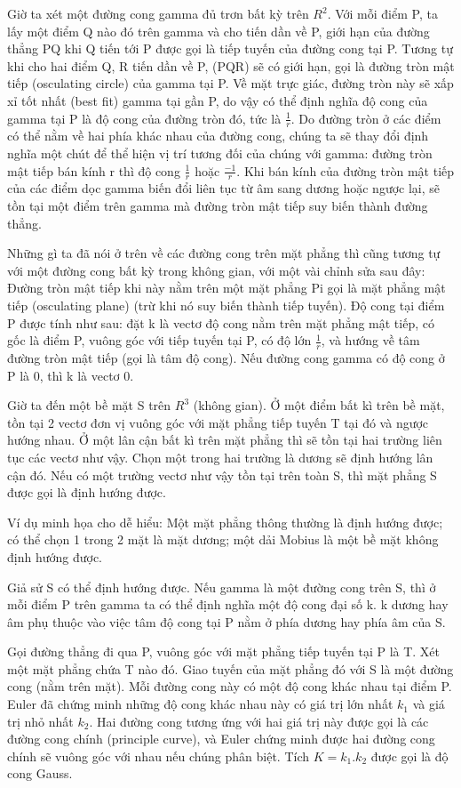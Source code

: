 \begin{multicols}{2}
	Giờ ta xét một đường cong gamma đủ trơn bất kỳ trên $R^2$. Với mỗi điểm P, ta lấy một điểm Q nào đó trên gamma và cho tiến dần về P, giới hạn của đường thẳng PQ khi Q tiến tới P được gọi là tiếp tuyến của đường cong tại P. Tương tự khi cho hai điểm Q, R tiến dần về P, (PQR) sẽ có giới hạn, gọi là đường tròn mật tiếp (osculating circle) của gamma tại P. Về mặt trực giác, đường tròn này sẽ xấp xỉ tốt nhất (best fit) gamma tại gần P, do vậy có thể định nghĩa độ cong của gamma tại P là độ cong của đường tròn đó, tức là $ \frac{1}{r}$. Do đường tròn ở các điểm có thể nằm về hai phía khác nhau của đường cong, chúng ta sẽ thay đổi định nghĩa một chút để thể hiện vị trí tương đối của chúng với gamma: đường tròn mật tiếp bán kính r thì độ cong $ \frac{1}{r}$ hoặc $ \frac{-1}{r}$. Khi bán kính của đường tròn mật tiếp của các điểm dọc gamma biến đổi liên tục từ âm sang dương hoặc ngược lại, sẽ tồn tại một điểm trên gamma mà đường tròn mật tiếp suy biến thành đường thẳng.
	
	Những gì ta đã nói ở trên về các đường cong trên mặt phẳng thì cũng tương tự với một đường cong bất kỳ trong không gian, với một vài chỉnh sửa sau đây:
	Đường tròn mật tiếp khi này nằm trên một mặt phẳng Pi gọi là mặt phẳng mật tiếp (osculating plane) (trừ khi nó suy biến thành tiếp tuyến). Độ cong tại điểm P được tính như sau: đặt k là vectơ độ cong nằm trên mặt phẳng mật tiếp, có gốc là điểm P, vuông góc với tiếp tuyến tại P, có độ lớn $ \frac{1}{r}$, và hướng về tâm đường tròn mật tiếp (gọi là tâm độ cong). Nếu đường cong gamma có độ cong ở P là 0, thì k là vectơ 0. 
	
	Giờ ta đến một bề mặt S trên $R^3$ (không gian). Ở một điểm bất kì trên bề mặt, tồn tại 2 vectơ đơn vị vuông góc với mặt phẳng tiếp tuyến T tại đó và ngược hướng nhau. Ở một lân cận bất kì trên mặt phẳng thì sẽ tồn tại hai trường liên tục các vectơ như vậy. Chọn một trong hai trường là dương sẽ định hướng lân cận đó. Nếu có một trường vectơ như vậy tồn tại trên toàn S, thì mặt phẳng S được gọi là định hướng được. 
	
	Ví dụ minh họa cho dễ hiểu: Một mặt phẳng thông thường là định hướng được; có thể chọn 1 trong 2 mặt là mặt dương; một dải Mobius là một bề mặt không định hướng được.
	
	Giả sử S có thể định hướng được. Nếu gamma là một đường cong trên S, thì ở mỗi điểm P trên gamma ta có thể định nghĩa một độ cong đại số k. k dương hay âm phụ thuộc vào việc tâm độ cong tại P nằm ở phía dương hay phía âm của S.
	
	Gọi đường thẳng đi qua P, vuông góc với mặt phẳng tiếp tuyến tại P là T. Xét một mặt phẳng chứa T nào đó. Giao tuyến của mặt phẳng đó với S là một đường cong (nằm trên mặt). Mỗi đường cong này có một độ cong khác nhau tại điểm P. Euler đã chứng minh những độ cong khác nhau này có giá trị lớn nhất $k_1$ và giá trị nhỏ nhất $k_2$. Hai đường cong tương ứng với hai giá trị này được gọi là các đường cong chính (principle curve), và Euler chứng minh được hai đường cong chính sẽ vuông góc với nhau nếu chúng phân biệt. Tích $K = k_1.k_2$ được gọi là độ cong Gauss. 
	

\end{multicols}
